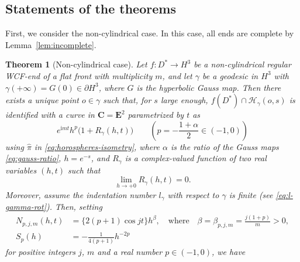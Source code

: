 \documentclass[a4paper]{amsart}
\theoremstyle{plain}
\newtheorem{theorem}{Theorem}[section]
\theoremstyle{remark}
\numberwithin{equation}{section}
\begin{document}
\subsection*{Statements of the theorems}
First, we consider the non-cylindrical case.
In this case, all ends are complete by Lemma~\ref{lem:incomplete}.
\begin{theorem}[Non-cylindrical case]\label{thm:non-cyl}
 Let $f\colon{}D^*\to H^3$ be a non-cylindrical regular WCF-end
 of a flat front with multiplicity $m$, and
 let $\gamma$ be a geodesic in $H^3$ with
 $\gamma(+\infty)=G(0)\in\partial H^3$,
 where $G$ is the hyperbolic Gauss map.
 Then there exists a unique point $o\in \gamma$
 such that, for $s$ large enough, 
$f(D^*)\cap{\mathcal{H}}_{\gamma}(o,s)$ is 
 identified with a curve in ${\boldsymbol{C}}={\boldsymbol{E}}^2$
 parametrized by $t$ as 
 \begin{equation}\label{eq:non-cyl-0}
      e^{{\mathrm{i}} m t}h^p\bigl(1+R_{\gamma}(h,t)\bigr)\qquad
     \left(p = -\frac{1+\alpha}{2}\in (-1,0)\right)
 \end{equation}
 using $\hat\pi$ in \eqref{eq:horospheres-isometry},
 where $\alpha$ is the ratio of the Gauss maps \eqref{eq:gauss-ratio},
 $h=e^{-s}$, and $R_{\gamma}$ is a complex-valued function of two real
 variables $(h,t)$ such that
 \[
     \lim_{h\to +0}R_{\gamma}(h,t) =0.
 \]
 Moreover,
 assume the indentation number $l_{\gamma}$ with respect to $\gamma$
 is finite {\rm(}see \eqref{eq:l-gamma-rot}{\rm)}.
 Then, setting
 \begin{equation}\label{eq:non-cyl-data}
  \begin{aligned}
	  N_{p,j,m}(h,t)&=\{2(p+1)\cos jt\}h^{\beta},\quad
         \text{where}\quad
            \beta =\beta_{p,j,m}= \frac{j(1+p)}{m}>0,\\
          S_p(h) &= -\frac{1}{4(p+1)}h^{-2p}
  \end{aligned}
 \end{equation}
 for positive integers $j$, $m$ and a real number $p\in (-1,0)$,
 we have
 \begingroup
 

\end{theorem}
\end{document}
